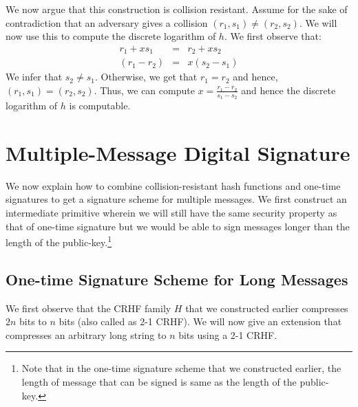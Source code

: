 We now argue that this construction is collision resistant. Assume for the sake of contradiction that an adversary gives a collision $(r_1,s_1) \neq (r_2,s_2)$. We will now use this to compute the discrete logarithm of $h$. We first observe that:
\begin{eqnarray*}
r_1+xs_1 &=& r_2 + xs_2\\
(r_1 - r_2) &=& x(s_2 - s_1)
\end{eqnarray*}
We infer that $s_2 \neq s_1$. Otherwise, we get that $r_1 = r_2$ and hence, $(r_1,s_1) = (r_2,s_2)$. Thus, we can compute $x = \frac{r_1-r_2}{s_1 - s_2}$ and hence the discrete logarithm of $h$ is computable.


\section{Multiple-Message Digital Signature}

We now explain how to combine collision-resistant hash functions and one-time signatures to get a signature scheme for multiple messages. We first construct an intermediate primitive wherein we will still have the same security property as that of one-time signature but we would be able to sign messages longer than the length of the public-key.\footnote{Note that in the one-time signature scheme that we constructed earlier, the length of message that can be signed is same as the length of the public-key.}


\subsection{One-time Signature Scheme for Long Messages}
We first observe that the CRHF family $H$ that we constructed earlier compresses $2n$ bits to $n$ bits (also called as 2-1 CRHF). We will now give an extension that compresses an arbitrary long string to $n$ bits using a 2-1 CRHF.
